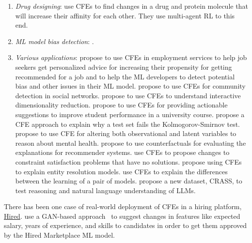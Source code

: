 \begin{enumerate}
    \item \emph{Drug designing}: \citet{nguyen2021-cfe-dta} use CFEs to find changes in a drug and protein molecule that will increase their affinity for each other. They use multi-agent RL to this end. 
    
    \item \emph{ML model bias detection}: \citep{Ustun19:Actionable,cfe-model-bias1, cfe-model-bias2}. 
    
    \item \emph{Various applications}: \citet{mazzine-CFE-employment} propose to use CFEs in employment services to help job seekers get personalized advice for increasing their propensity for getting recommended for a job and to help the ML developers to detect potential bias and other issues in their ML model. \citet{Sadler-cfe-community-detection} propose to use CFEs for community detection in social networks. \citet{dimension_reduction_cfe} propose to use CFEs to understand interactive dimensionality reduction. \citet{student-performance-cfe} propose to use CFEs for providing actionable suggestions to improve student performance in a university course. \citet{Cong-CFE-KS-test} propose a CFE approach to explain why a test set fails the Kolmogorov-Smirnov test. \citet{Marchezini2022-dh-cfe-latent-mental-health} propose to use CFE for altering both observational and latent variables to reason about mental health. \citet{yao-cfe-evaluate-recsys} propose to use counterfactuals for evaluating the explanations for recommender systems. \citet{gupta-cfe-constraint-satisfaction-problem} use CFEs to propose changes to constraint satisfaction problems that have no solutions. \citet{cfe-for-entity-resolution} propose using CFEs to explain entity resolution models. \citet{artelt-cfe-model-adaptation} use CFEs to explain the differences between the learning of a pair of models. 
    \citet{CRASS-dataset-NLP} propose a new dataset, CRASS, to test reasoning and natural language understanding of LLMs. 
\end{enumerate}

There has been one case of real-world deployment of CFEs in a hiring platform, \href{https://hired.com/}{Hired}. \citet{nemirovsky-cfe-gan-hiring-application} use a GAN-based approach~\citep{nemirovsky-hired-people-cfe-countergan} to suggest changes in features like expected salary, years of experience, and skills to candidates in order to get them approved by the Hired Marketplace ML model. 

